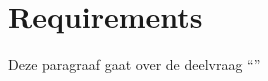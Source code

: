 \chapter{Requirements}

\label{Chapter7}

Deze paragraaf gaat over de deelvraag \enquote{\deelrequirements}